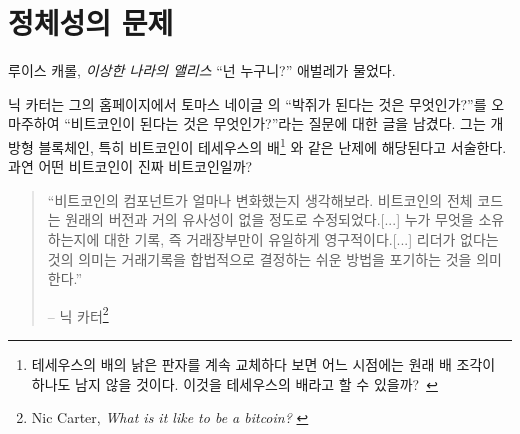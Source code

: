\chapter{정체성의 문제}
\label{les:4}

\begin{chapquote}{루이스 캐롤, \textit{이상한 나라의 앨리스}}
  \enquote{넌 누구니?} 애벌레가 물었다.
\end{chapquote}

닉 카터는 그의 홈페이지에서 토마스 네이글
의 \enquote{박쥐가 된다는 것은 무엇인가?}를 오마주하여 
\enquote{비트코인이 된다는 것은 무엇인가?}라는 질문에 대한 글을 남겼다. 
그는 개방형 블록체인, 특히 비트코인이 테세우스의 배\footnote{테세우스의 배의 낡은 판자를 계속 교체하다 보면 어느 시점에는 원래 배 조각이 하나도 남지 않을 것이다. 이것을 테세우스의 배라고 할 수 있을까?~\cite{wiki:theseus}}
와 같은 난제에 해당된다고 서술한다.
과연 어떤 비트코인이 진짜 비트코인일까?

\begin{quotation}\begin{samepage}
\enquote{비트코인의 컴포넌트가 얼마나 변화했는지 생각해보라. 비트코인의 전체 코드는
원래의 버전과 거의 유사성이 없을 정도로 수정되었다.[...] 누가 무엇을 소유하는지에 대한
기록, 즉 거래장부만이 유일하게 영구적이다.[...] 리더가 없다는 것의 의미는
거래기록을 합법적으로 결정하는 쉬운 방법을 포기하는 것을 의미한다.}
\begin{flushright} -- 닉 카터\footnote{Nic Carter, \textit{What is it like to be a bitcoin?} \cite{bitcoin-identity}}
\end{flushright}\end{samepage}\end{quotation}


